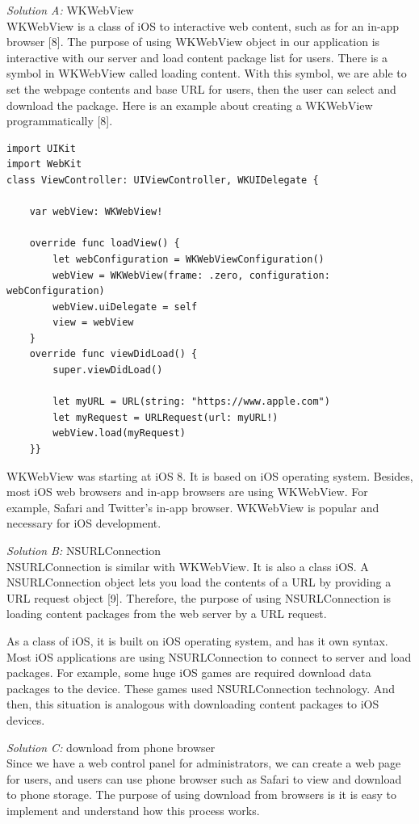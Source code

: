 \documentclass[letterpaper, 10pt,titlepage]{article}
\begin{document}
\textit{Solution A:} WKWebView\\
WKWebView is a class of iOS to interactive web content, such as for an in-app browser [8]. The purpose of using WKWebView object in our application is interactive with our server and load content package list for users. There is a symbol in WKWebView called loading content. With this symbol, we are able to set the webpage contents and base URL for users, then the user can select and download the package. Here is an example about creating a WKWebView programmatically [8].

\begin{verbatim}
import UIKit
import WebKit
class ViewController: UIViewController, WKUIDelegate {
    
    var webView: WKWebView!
    
    override func loadView() {
        let webConfiguration = WKWebViewConfiguration()
        webView = WKWebView(frame: .zero, configuration: webConfiguration)
        webView.uiDelegate = self
        view = webView
    }
    override func viewDidLoad() {
        super.viewDidLoad()
        
        let myURL = URL(string: "https://www.apple.com")
        let myRequest = URLRequest(url: myURL!)
        webView.load(myRequest)
    }}
\end{verbatim}

WKWebView was starting at iOS 8. It is based on iOS operating system. Besides,  most iOS web browsers and in-app browsers are using WKWebView. For example, Safari and Twitter’s in-app browser. WKWebView is popular and necessary for iOS development.


\textit{Solution B:} NSURLConnection \\
NSURLConnection is similar with WKWebView. It is also a class iOS. A NSURLConnection object lets you load the contents of a URL by providing a URL request object [9]. Therefore, the purpose of using NSURLConnection is loading content packages from the web server by a URL request. 


As a class of iOS, it is built on iOS operating system, and has it own syntax. Most iOS applications are using NSURLConnection to connect to server and load packages. For example, some huge iOS games are required download data packages to the device. These games used NSURLConnection technology. And then, this situation is analogous with downloading content packages to iOS devices. 


\textit{Solution C:} download from phone browser \\
Since we have a web control panel for administrators, we can create a web page for users, and users can use phone browser such as Safari to view and download to phone storage. The purpose of using download from browsers is it is easy to implement and understand how this process works.
\end{document}

